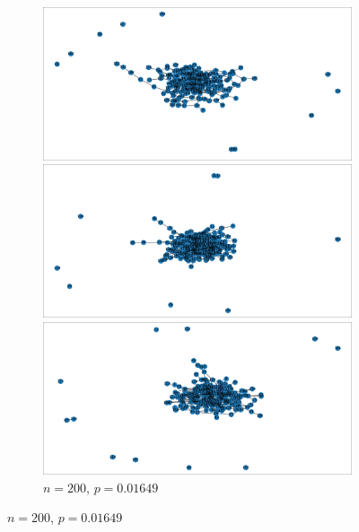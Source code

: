\documentclass{article}
\begin{document}
\begin{figure}[htb]
    \centering
    \begin{subfigure}{\textwidth}
        \centering
        \begin{minipage}{0.32\textwidth}
            \centering
            \includegraphics[width=\linewidth]{images/erdos_renyi/n200_p0.016491586832740178_0.pdf}
        \end{minipage}\hfill
        \begin{minipage}{0.32\textwidth}
            \centering
            \includegraphics[width=\linewidth]{images/erdos_renyi/n200_p0.016491586832740178_1.pdf}
        \end{minipage}\hfill
        \begin{minipage}{0.32\textwidth}
            \centering
            \includegraphics[width=\linewidth]{images/erdos_renyi/n200_p0.016491586832740178_2.pdf}
        \end{minipage}
        \caption{$n=200$, $p=0.01649$}
    \end{subfigure}


\end{figure}
\end{document}
